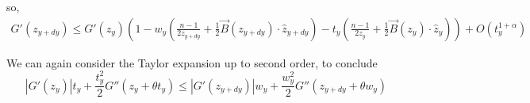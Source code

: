 \documentclass{article}
\theoremstyle{plain}
\theoremstyle{definition}
\theoremstyle{plain}
\begin{document}
so, \begin{multline}
G'(z_{y+dy}) \le G'(z_y) \left( 1 - w_y \left( \frac{n-1}{2 z_{y+dy}} + \frac{1}{2} \vec{B}(z_{y+dy}) \cdot \hat{z}_{y+dy} \right) - t_y \left( \frac{n-1}{2 z_y} + \frac{1}{2} \vec{B}(z_y) \cdot \hat{z}_y \right) \right) + O(t_y^{1+\alpha})
\end{multline}


We can again consider the Taylor expansion up to second order, to conclude
\begin{equation} \label{18}
|G'(z_y)| t_y + \frac{t_y^2}{2} G''(z_y + \theta t_y) \le |G'(z_{y+dy})| w_y + \frac{w_y^2}{2} G''(z_{y+dy} + \theta w_y)
\end{equation}
\end{document}
